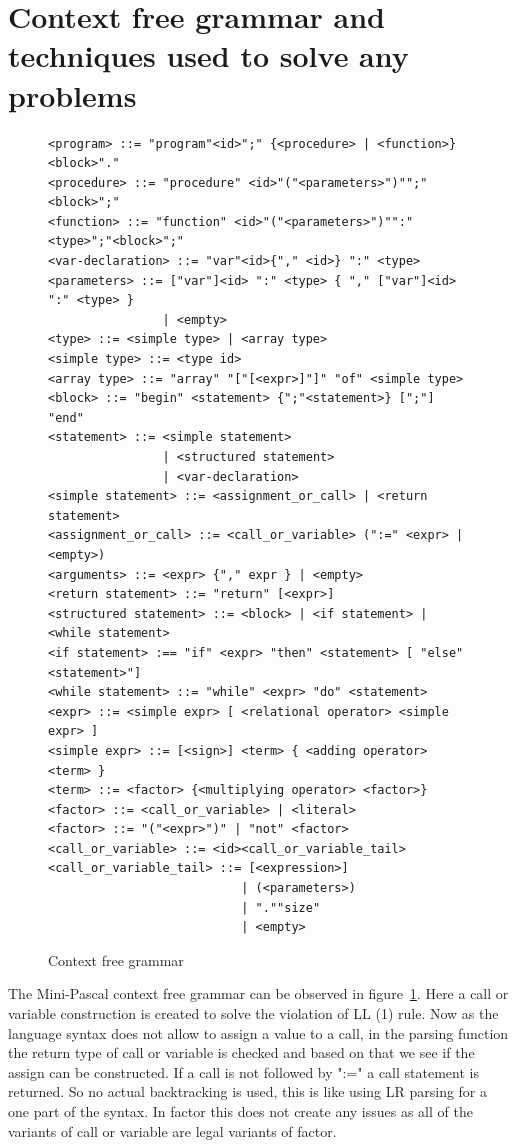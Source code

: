 \documentclass[12pt,a4paper]{article}
\begin{document}
\section{Context free grammar and techniques used to solve any problems}
\begin{figure}
\caption{Context free grammar}\label{cfg}
\begin{verbatim}
<program> ::= "program"<id>";" {<procedure> | <function>}<block>"."
<procedure> ::= "procedure" <id>"("<parameters>")"";"<block>";"
<function> ::= "function" <id>"("<parameters>")"":"<type>";"<block>";"
<var-declaration> ::= "var"<id>{"," <id>} ":" <type>
<parameters> ::= ["var"]<id> ":" <type> { "," ["var"]<id> ":" <type> }
                | <empty>
<type> ::= <simple type> | <array type>
<simple type> ::= <type id>
<array type> ::= "array" "["[<expr>]"]" "of" <simple type>
<block> ::= "begin" <statement> {";"<statement>} [";"] "end"
<statement> ::= <simple statement>
                | <structured statement>
                | <var-declaration>
<simple statement> ::= <assignment_or_call> | <return statement>
<assignment_or_call> ::= <call_or_variable> (":=" <expr> | <empty>)
<arguments> ::= <expr> {"," expr } | <empty>
<return statement> ::= "return" [<expr>]
<structured statement> ::= <block> | <if statement> | <while statement>
<if statement> :== "if" <expr> "then" <statement> [ "else" <statement>"]
<while statement> ::= "while" <expr> "do" <statement>
<expr> ::= <simple expr> [ <relational operator> <simple expr> ]
<simple expr> ::= [<sign>] <term> { <adding operator> <term> }
<term> ::= <factor> {<multiplying operator> <factor>}
<factor> ::= <call_or_variable> | <literal> 
<factor> ::= "("<expr>")" | "not" <factor>
<call_or_variable> ::= <id><call_or_variable_tail>
<call_or_variable_tail> ::= [<expression>]
                           | (<parameters>)
                           | ".""size"
                           | <empty> 
\end{verbatim}
\end{figure}

The Mini-Pascal context free grammar can be observed in figure~\ref{cfg}.
Here a call or variable construction is created to solve the violation
of LL (1) rule. Now as the language syntax does not allow
to assign a value to a call, in the parsing function the return type
of call or variable is checked and based on that we see if
the assign can be constructed. If a call is not followed by ":=" 
a call statement is returned. So no actual backtracking is used,
this is like using LR parsing for a one part of the syntax.
In factor this does not create any issues as all of the
variants of call or variable are legal variants of factor.
\end{document}
